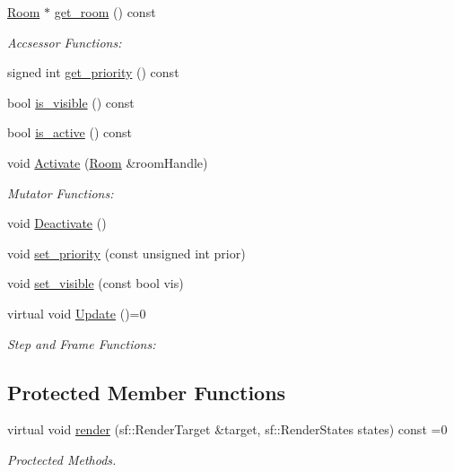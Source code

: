 \begin{DoxyCompactItemize}
\item 
\hyperlink{class_helios_1_1_room}{Room} $\ast$ \hyperlink{class_helios_1_1_base_obj_a896030076cb96c794f4b202cca0ec584}{get\+\_\+room} () const 
\begin{DoxyCompactList}\small\item\em Accsessor Functions\+: \end{DoxyCompactList}\item 
signed int \hyperlink{class_helios_1_1_base_obj_abf2a6d187e1c8329bb8e24256218aecb}{get\+\_\+priority} () const 
\item 
bool \hyperlink{class_helios_1_1_base_obj_a418fb8f5e8aa25f0969e37e24cadb8c9}{is\+\_\+visible} () const 
\item 
bool \hyperlink{class_helios_1_1_base_obj_a8c748b30dca39c303e8bb9085f9d6d15}{is\+\_\+active} () const 
\item 
void \hyperlink{class_helios_1_1_base_obj_a7823cb052c6c97f4aab120f6eb864392}{Activate} (\hyperlink{class_helios_1_1_room}{Room} \&room\+Handle)
\begin{DoxyCompactList}\small\item\em Mutator Functions\+: \end{DoxyCompactList}\item 
void \hyperlink{class_helios_1_1_base_obj_ade0a810a861f41a43adf0e7c766951d1}{Deactivate} ()
\item 
void \hyperlink{class_helios_1_1_base_obj_ad3335cdcb1dfc4ee7e749dbb32f8cd2a}{set\+\_\+priority} (const unsigned int prior)
\item 
void \hyperlink{class_helios_1_1_base_obj_a354767a20905778fefe96fe895a382ae}{set\+\_\+visible} (const bool vis)
\item 
virtual void \hyperlink{class_helios_1_1_base_obj_aa42e26e872234b6871d159c29afdef17}{Update} ()=0
\begin{DoxyCompactList}\small\item\em Step and Frame Functions\+: \end{DoxyCompactList}\end{DoxyCompactItemize}
\subsection*{Protected Member Functions}
\begin{DoxyCompactItemize}
\item 
virtual void \hyperlink{class_helios_1_1_base_obj_af7355477f06d38692dc6cdb6f99dbd11}{render} (sf\+::\+Render\+Target \&target, sf\+::\+Render\+States states) const  =0
\begin{DoxyCompactList}\small\item\em Proctected Methods. \end{DoxyCompactList}\end{DoxyCompactItemize}
